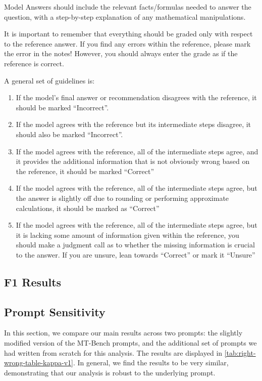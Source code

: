 Model Answers should include the relevant facts/formulas needed to answer the
question, with a step-by-step explanation of any mathematical manipulations.

It is important to remember that everything should be graded only with respect
to the reference answer. If you find any errors within the reference, please
mark the error in the notes! However, you should always enter the grade as if
the reference is correct.

A general set of guidelines is:
\begin{enumerate}

        \item If the model’s final answer or recommendation disagrees with the reference, it should be marked “Incorrect”.
        \item If the model agrees with the reference but its intermediate steps disagree, it should also be marked “Incorrect”.
        \item If the model agrees with the reference, all of the intermediate steps agree, and it provides the additional information that is not obviously wrong based on the reference, it should be marked “Correct”
        \item If the model agrees with the reference, all of the intermediate steps agree, but the answer is slightly off due to rounding or performing approximate calculations, it should be marked as “Correct”
        \item If the model agrees with the reference, all of the intermediate steps agree, but it is lacking some amount of information given within the reference, you should make a judgment call as to whether the missing information is crucial to the answer. If you are unsure, lean towards “Correct” or mark it “Unsure”

\end{enumerate}

\subsection{F1 Results}
\label{ref:f1_table}


\subsection{Prompt Sensitivity}
\label{sec:prompt_sensitivity} 

In this section, we compare our main results across two prompts: the slightly modified version of the MT-Bench prompts, and the additional set of prompts we had written from scratch for this analysis. The results are displayed in \cref{tab:right-wrong-table-kappa-v1}. In general, we find the results to be very similar, demonstrating that our analysis is robust to the underlying prompt. 

